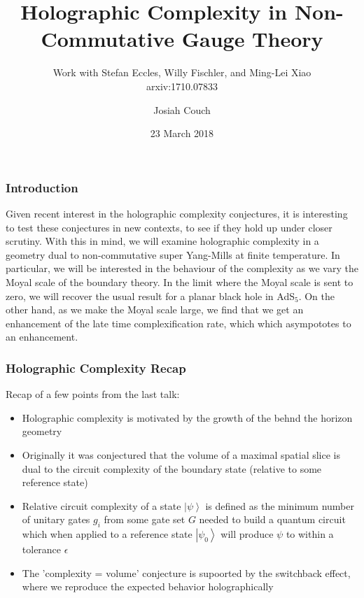 \documentclass[10pt]{beamer}
\title{Holographic Complexity in Non-Commutative Gauge Theory}
\subtitle{Work with Stefan Eccles, Willy Fischler, and Ming-Lei Xiao\\ arxiv:1710.07833}
\author{Josiah Couch}
\institute{University of Texas at Austin}
\date{23 March 2018}
\newcommand{\ket}[1]{\left| #1 \right>}
\begin{document}
\begin{frame}
\titlepage\end{frame}



\begin{frame}
\frametitle{Introduction}

Given recent interest in the holographic complexity conjectures, it is interesting to test these conjectures in new contexts, to see if they hold up under closer scrutiny. With this in mind, we will examine holographic complexity in a geometry dual to non-commutative super Yang-Mills at finite temperature. In particular, we will be interested in the behaviour of the complexity as we vary the Moyal scale of the boundary theory. In the limit where the Moyal scale is sent to zero, we will recover the usual result for a planar black hole in AdS$_5$. On the other hand, as we make the Moyal scale large, we find that we get an enhancement of the late time complexification rate, which which asympototes to an enhancement.

\end{frame}

\begin{frame}
\frametitle{Holographic Complexity Recap}

Recap of a few points from the last talk:

\begin{itemize}

\item Holographic complexity is motivated by the growth of the behnd the horizon geometry

\item Originally it was conjectured that the volume of a maximal spatial slice is dual to the circuit complexity of the boundary state (relative to some reference state)

\item Relative circuit complexity of a state $\ket{\psi}$ is defined as the minimum number of unitary gates $g_i$ from some gate set $G$ needed to build a quantum circuit which when applied to a reference state $\ket{\psi_0}$ will produce $\psi$ to within a tolerance $\epsilon$

\item The 'complexity = volume' conjecture is supoorted by the switchback effect, where we reproduce the expected behavior holographically

\end{itemize}

\end{frame}
\end{document}
